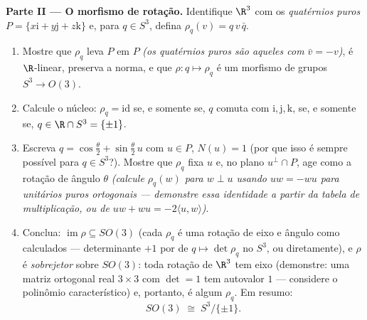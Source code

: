 \begin{problem}
\medskip
\noindent\textbf{Parte II --- O morfismo de rotação.} Identifique
$\R^3$ com os \emph{quatérnios puros} $P = \{x\mathrm i +
y\mathrm j + z\mathrm k\}$ e, para $q \in S^3$, defina
$\rho_q(v) = q\,v\,\bar q$.
\begin{enumerate}[resume]
  \item Mostre que $\rho_q$ leva $P$ em $P$ \emph{(os
        quatérnios puros são aqueles com $\bar v = -v$)}, é $\R$-linear,
        preserva a norma, e que $\rho
        \colon q \mapsto \rho_q$ é um morfismo de grupos $S^3
        \to O(3)$.
  \item Calcule o núcleo: $\rho_q = \mathrm{id}$ se, e somente se, $q$ comuta com
        $\mathrm i, \mathrm j, \mathrm k$, se, e somente se, $q \in \R\cap S^3 = \{\pm1\}$.
  \item Escreva $q = \cos\frac\theta2 + \sin\frac\theta2\,u$ com $u \in P$, $N(u) = 1$ (por que isso é sempre possível
        para $q \in S^3$?). Mostre que $\rho_q$ fixa $u$ e, no plano
        $u^\perp\cap P$, age como a rotação de ângulo $\theta$ \emph{(calcule
        $\rho_q(w)$ para $w \perp u$ usando $uw = -wu$ para unitários puros ortogonais ---
        demonstre essa identidade a partir da tabela de multiplicação,
        ou de $uw + wu =
        -2\langle u, w\rangle$)}.
  \item Conclua: $\operatorname{im}\rho \subseteq SO(3)$ (cada $\rho_q$ é uma rotação de eixo e ângulo
        como calculados --- determinante $+1$ por  de
        $q
        \mapsto \det\rho_q$ no  $S^3$, ou diretamente), e $\rho$ é
        \emph{sobrejetor} sobre $SO(3)$: toda rotação de $\R^3$
        tem eixo (demonstre: uma matriz ortogonal real $3\times3$ com $\det = 1$
        tem autovalor $1$ --- considere o polinômio característico) e,
        portanto, é algum $\rho_q$. Em resumo:
        \[
        SO(3) \;\cong\; S^3/\{\pm 1\} .
        \]
\end{enumerate}


\end{problem}
